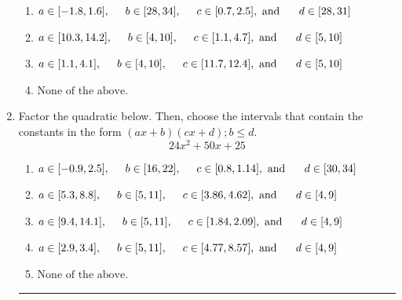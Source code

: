 \documentclass[14pt]{extbook}
\newcommand{\litem}[1]{\item#1\hspace*{-1cm}\rule{\textwidth}{0.4pt}}
\begin{document}
\begin{enumerate}
{\begin{enumerate}[label=\Alph*.]
\item \( a \in [-1.8, 1.6], \hspace*{5mm} b \in [28, 34], \hspace*{5mm} c \in [0.7, 2.5], \text{ and } \hspace*{5mm} d \in [28, 31] \)
\item \( a \in [10.3, 14.2], \hspace*{5mm} b \in [4, 10], \hspace*{5mm} c \in [1.1, 4.7], \text{ and } \hspace*{5mm} d \in [5, 10] \)
\item \( a \in [1.1, 4.1], \hspace*{5mm} b \in [4, 10], \hspace*{5mm} c \in [11.7, 12.4], \text{ and } \hspace*{5mm} d \in [5, 10] \)
\item \( \text{None of the above.} \)

\end{enumerate} }
\litem{
Factor the quadratic below. Then, choose the intervals that contain the constants in the form $(ax+b)(cx+d); b \leq d.$\[ 24x^{2} +50 x + 25 \]\begin{enumerate}[label=\Alph*.]
\item \( a \in [-0.9, 2.5], \hspace*{5mm} b \in [16, 22], \hspace*{5mm} c \in [0.8, 1.14], \text{ and } \hspace*{5mm} d \in [30, 34] \)
\item \( a \in [5.3, 8.8], \hspace*{5mm} b \in [5, 11], \hspace*{5mm} c \in [3.86, 4.62], \text{ and } \hspace*{5mm} d \in [4, 9] \)
\item \( a \in [9.4, 14.1], \hspace*{5mm} b \in [5, 11], \hspace*{5mm} c \in [1.84, 2.09], \text{ and } \hspace*{5mm} d \in [4, 9] \)
\item \( a \in [2.9, 3.4], \hspace*{5mm} b \in [5, 11], \hspace*{5mm} c \in [4.77, 8.57], \text{ and } \hspace*{5mm} d \in [4, 9] \)
\item \( \text{None of the above.} \)


\end{enumerate}}
\end{enumerate}
\end{document}
